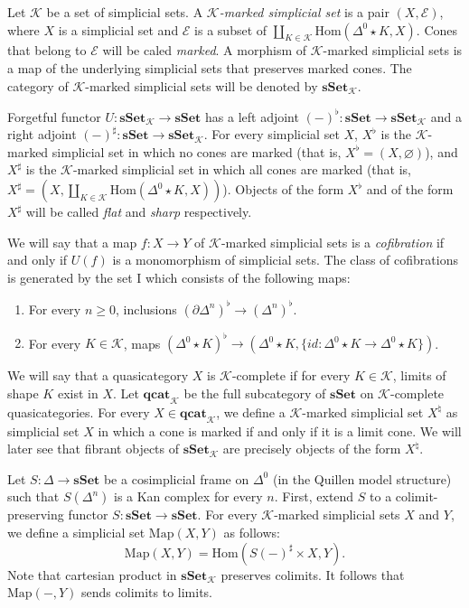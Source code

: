 \documentclass[reqno]{amsart}
\theoremstyle{definition}
\theoremstyle{remark}
\newcommand{\cat}[1]{\mathbf{#1}}
\newcommand{\sSet}{\cat{sSet}}
\newcommand{\K}{$\mathcal{K}$}
\newcommand{\csSet}{\sSet_\mathcal{K}}
\newcommand{\cqCat}{\cat{qcat}_\mathcal{K}}
\newcommand{\join}{\star}
\newcommand{\Hom}{\mathrm{Hom}}
\newcommand{\Map}{\mathrm{Map}}
\newcommand{\I}{\mathrm{I}}
\numberwithin{figure}{section}
\begin{document}
\begin{defn}
Let $\mathcal{K}$ be a set of simplicial sets.
A \emph{\K-marked simplicial set} is a pair $(X,\mathcal{E})$, where $X$ is a simplicial set and $\mathcal{E}$ is a subset of $\coprod_{K \in \mathcal{K}} \Hom(\Delta^0 \join K, X)$.
Cones that belong to $\mathcal{E}$ will be caled \emph{marked}.
A morphism of \K-marked simplicial sets is a map of the underlying simplicial sets that preserves marked cones.
The category of \K-marked simplicial sets will be denoted by $\csSet$.
\end{defn}

Forgetful functor $U : \csSet \to \sSet$ has a left adjoint $(-)^\flat : \sSet \to \csSet$ and a right adjoint $(-)^\sharp : \sSet \to \csSet$.
For every simplicial set $X$, $X^\flat$ is the \K-marked simplicial set in which no cones are marked (that is, $X^\flat = (X,\varnothing)$),
and $X^\sharp$ is the \K-marked simplicial set in which all cones are marked (that is, $X^\sharp = (X,\coprod_{K \in \mathcal{K}} \Hom(\Delta^0 \join K, X))$).
Objects of the form $X^\flat$ and of the form $X^\sharp$ will be called \emph{flat} and \emph{sharp} respectively.

We will say that a map $f : X \to Y$ of \K-marked simplicial sets is a \emph{cofibration} if and only if $U(f)$ is a monomorphism of simplicial sets. 
The class of cofibrations is generated by the set $\I$ which consists of the following maps:
\begin{enumerate}
\item For every $n \geq 0$, inclusions $(\partial \Delta^n)^\flat \to (\Delta^n)^\flat$.
\item For every $K \in \mathcal{K}$, maps $(\Delta^0 \join K)^\flat \to (\Delta^0 \join K, \{ id : \Delta^0 \join K \to \Delta^0 \join K \})$.
\end{enumerate}

We will say that a quasicategory $X$ is \K-complete if for every $K \in \mathcal{K}$, limits of shape $K$ exist in $X$.
Let $\cqCat$ be the full subcategory of $\sSet$ on \K-complete quasicategories.
For every $X \in \cqCat$, we define a \K-marked simplicial set $X^\natural$ as simplicial set $X$ in which a cone is marked if and only if it is a limit cone.
We will later see that fibrant objects of $\csSet$ are precisely objects of the form $X^\natural$.

Let $S : \Delta \to \sSet$ be a cosimplicial frame on $\Delta^0$ (in the Quillen model structure) such that $S(\Delta^n)$ is a Kan complex for every $n$.
First, extend $S$ to a colimit-preserving functor $S : \sSet \to \sSet$.
For every \K-marked simplicial sets $X$ and $Y$, we define a simplicial set $\Map(X,Y)$ as follows:
\[ \Map(X,Y) = \Hom(S(-)^\sharp \times X, Y). \]
Note that cartesian product in $\csSet$ preserves colimits.
It follows that $\Map(-,Y)$ sends colimits to limits.
\end{document}
